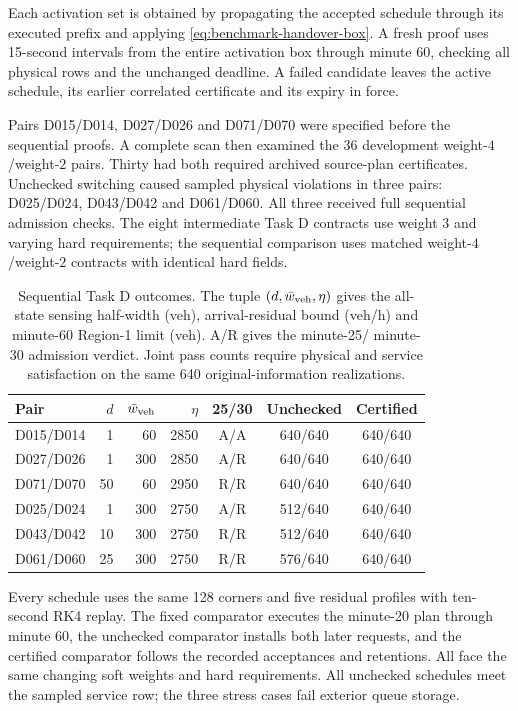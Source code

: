 \documentclass[journal,10pt]{IEEEtran}
\begin{document}
Each activation set is obtained by propagating the accepted schedule
through its executed prefix and applying
\eqref{eq:benchmark-handover-box}. A fresh proof uses 15-second intervals
from the entire activation box through minute 60, checking all physical
rows and the unchanged deadline. A failed candidate leaves the active
schedule, its earlier correlated certificate and its expiry in force.

Pairs D015/D014, D027/D026 and D071/D070 were specified before the
sequential proofs. A complete scan then examined the 36 development
weight-$4$/weight-$2$ pairs. Thirty had both required archived source-plan
certificates. Unchecked switching caused sampled physical violations in
three pairs: D025/D024, D043/D042 and D061/D060. All three received full
sequential admission checks. The eight intermediate Task D contracts
use weight $3$ and varying hard requirements; the sequential comparison
uses matched weight-$4$/weight-$2$ contracts with identical hard fields.

\begin{table}[t]
\centering\small
\caption{Sequential Task D outcomes. The tuple $(d,\bar w_{\rm veh},\eta)$
gives the all-state sensing half-width (veh), arrival-residual bound
(veh/h) and minute-60 Region-1 limit (veh). A/R gives the minute-25/
minute-30 admission verdict. Joint pass counts require physical and
service satisfaction on the same 640 original-information realizations.}
\label{tab:supp-sequential-coverage}
\setlength{\tabcolsep}{4pt}
\begin{tabular}{@{}lrrrccc@{}}
\toprule
Pair & $d$ & $\bar w_{\rm veh}$ & $\eta$ & 25/30 & Unchecked & Certified\\
\midrule
D015/D014 & 1 & 60 & 2850 & A/A & 640/640 & 640/640\\
D027/D026 & 1 & 300 & 2850 & A/R & 640/640 & 640/640\\
D071/D070 & 50 & 60 & 2950 & R/R & 640/640 & 640/640\\
D025/D024 & 1 & 300 & 2750 & A/R & 512/640 & 640/640\\
D043/D042 & 10 & 300 & 2750 & R/R & 512/640 & 640/640\\
D061/D060 & 25 & 300 & 2750 & R/R & 576/640 & 640/640\\
\bottomrule
\end{tabular}
\end{table}

Every schedule uses the same 128 corners and five residual profiles with
ten-second RK4 replay. The fixed comparator executes the minute-20 plan
through minute 60, the unchecked comparator installs both later requests,
and the certified comparator follows the recorded acceptances and
retentions. All face the same changing soft weights and hard requirements.
All unchecked schedules meet the sampled service row; the three stress
cases fail exterior queue storage.
\end{document}
